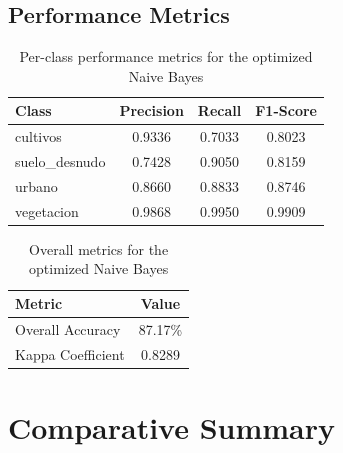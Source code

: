 \documentclass[12pt,a4paper]{article}
\begin{document}
\subsection{Performance Metrics}

\begin{table}[H]
\centering
\begin{tabular}{|m{4cm}|c|c|c|}
\hline
\textbf{Class} & \textbf{Precision} & \textbf{Recall} & \textbf{F1-Score} \\
\hline
cultivos       & 0.9336 & 0.7033 & 0.8023 \\
\hline
suelo\_desnudo & 0.7428 & 0.9050 & 0.8159 \\
\hline
urbano         & 0.8660 & 0.8833 & 0.8746 \\
\hline
vegetacion     & 0.9868 & 0.9950 & 0.9909 \\
\hline
\end{tabular}
\caption{Per-class performance metrics for the optimized Naive Bayes}
\end{table}

\begin{table}[H]
\centering
\begin{tabular}{|m{5cm}|c|}
\hline
\textbf{Metric} & \textbf{Value} \\
\hline
Overall Accuracy  & 87.17\% \\
\hline
Kappa Coefficient & 0.8289 \\
\hline
\end{tabular}
\caption{Overall metrics for the optimized Naive Bayes}
\end{table}

\section{Comparative Summary}
\end{document}

